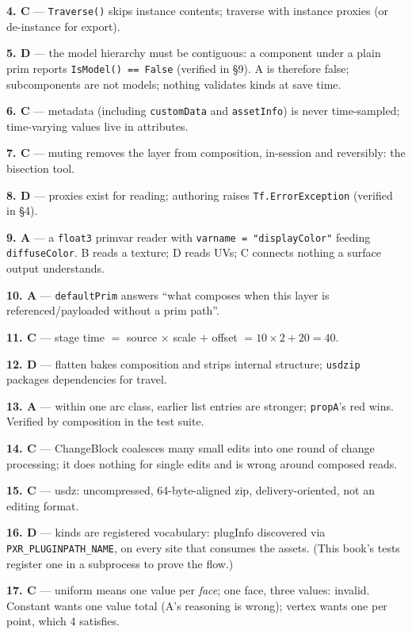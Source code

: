 \noindent\textbf{4. C} --- \texttt{Traverse()} skips instance contents;
traverse with instance proxies (or de-instance for export).

\noindent\textbf{5. D} --- the model hierarchy must be contiguous: a
component under a plain prim reports \texttt{IsModel() == False} (verified
in \S9). A is therefore false; subcomponents are not models; nothing
validates kinds at save time.

\noindent\textbf{6. C} --- metadata (including \texttt{customData} and
\texttt{assetInfo}) is never time-sampled; time-varying values live in
attributes.

\noindent\textbf{7. C} --- muting removes the layer from composition,
in-session and reversibly: the bisection tool.

\noindent\textbf{8. D} --- proxies exist for reading; authoring raises
\texttt{Tf.ErrorException} (verified in \S4).

\noindent\textbf{9. A} --- a \texttt{float3} primvar reader with
\texttt{varname = "displayColor"} feeding \texttt{diffuseColor}. B reads
a texture; D reads UVs; C connects nothing a surface output understands.

\noindent\textbf{10. A} --- \texttt{defaultPrim} answers ``what composes
when this layer is referenced/payloaded without a prim path''.

\noindent\textbf{11. C} --- stage time $=$ source $\times$ scale $+$ offset
$= 10 \times 2 + 20 = 40$.

\noindent\textbf{12. D} --- flatten bakes composition and strips internal
structure; \texttt{usdzip} packages dependencies for travel.

\noindent\textbf{13. A} --- within one arc class, earlier list entries are
stronger; \texttt{propA}'s red wins. Verified by composition in the test
suite.

\noindent\textbf{14. C} --- ChangeBlock coalesces many small edits into one
round of change processing; it does nothing for single edits and is wrong
around composed reads.

\noindent\textbf{15. C} --- usdz: uncompressed, 64-byte-aligned zip,
delivery-oriented, not an editing format.

\noindent\textbf{16. D} --- kinds are registered vocabulary: plugInfo
discovered via \texttt{PXR\_PLUGINPATH\_NAME}, on every site that consumes
the assets. (This book's tests register one in a subprocess to prove the
flow.)

\noindent\textbf{17. C} --- uniform means one value per \emph{face}; one
face, three values: invalid. Constant wants one value total (A's reasoning
is wrong); vertex wants one per point, which 4 satisfies.

